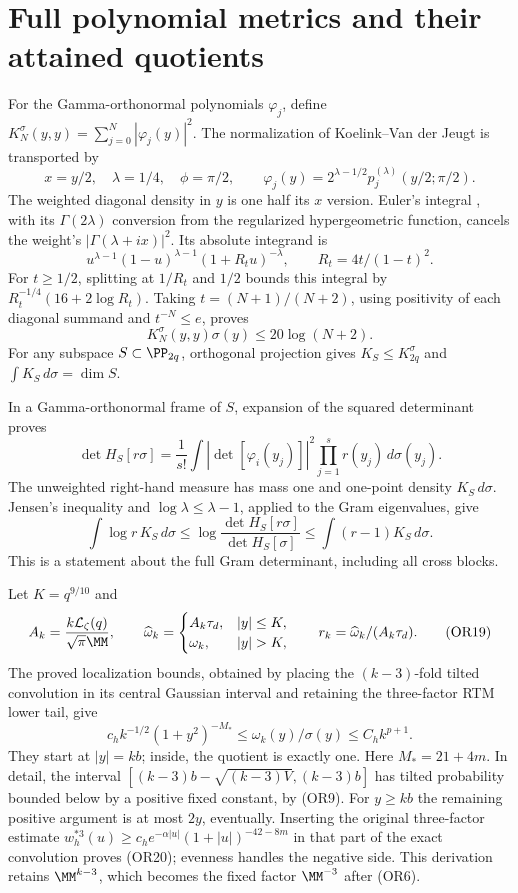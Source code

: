 \section{Full polynomial metrics and their attained quotients}
For the Gamma-orthonormal polynomials \(\varphi_j\), define
\(K_N^\sigma(y,y)=\sum_{j=0}^N|\varphi_j(y)|^2\).
The normalization of Koelink--Van der Jeugt
\cite[Proposition 2.1, (2.9)]{or:KVJ} is transported by
\[
 x=y/2,\quad\lambda=1/4,\quad\phi=\pi/2,\qquad
 \varphi_j(y)=2^{\lambda-1/2}p_j^{(\lambda)}(y/2;\pi/2).
\]
The weighted diagonal density in \(y\) is one half its \(x\) version.
Euler's integral \cite[(15.6.1)]{or:DLMFhyper}, with its
\(\Gamma(2\lambda)\) conversion from the regularized
hypergeometric function, cancels the weight's
\(|\Gamma(\lambda+ix)|^2\).  Its absolute integrand is
\[
 u^{\lambda-1}(1-u)^{\lambda-1}(1+R_tu)^{-\lambda},
 \qquad R_t=4t/(1-t)^2 .
 \]
For \(t\geq1/2\), splitting at \(1/R_t\) and \(1/2\) bounds this
integral by \(R_t^{-1/4}(16+2\log R_t)\).
Taking \(t=(N+1)/(N+2)\), using positivity of each diagonal
summand and \(t^{-N}\leq e\), proves
\[
 K_N^\sigma(y,y)\sigma(y)\leq20\log(N+2).              \tag{OR17}
\]
For any subspace \(S\subset\PP_{2q}\), orthogonal projection gives
\(K_S\leq K_{2q}^\sigma\) and \(\int K_S\,d\sigma=\dim S\).

In a Gamma-orthonormal frame of \(S\), expansion of the squared
determinant proves
\[
 \det H_S[r\sigma]
 =\frac1{s!}\int|\det[\varphi_i(y_j)]|^2
              \prod_{j=1}^s r(y_j)\,d\sigma(y_j).
 \]
The unweighted right-hand measure has mass one and one-point
density \(K_S\,d\sigma\).  Jensen's inequality and
\(\log\lambda\leq\lambda-1\), applied to the Gram eigenvalues, give
\[
 \int\log r\,K_S\,d\sigma
 \leq\log\frac{\det H_S[r\sigma]}{\det H_S[\sigma]}
 \leq\int(r-1)K_S\,d\sigma.                          \tag{OR18}
\]
This is a statement about the full Gram determinant, including all
cross blocks.

Let \(K=q^{9/10}\) and
\[
 A_k=\frac{k\mathcal L_\zeta(q)}{\sqrt\pi\MM},\qquad
 \widehat\omega_k=
 \begin{cases}A_k\tau_d,&|y|\leq K,\\
 \omega_k,&|y|>K,\end{cases}\qquad
 r_k=\widehat\omega_k/(A_k\tau_d).                    \tag{OR19}
\]
The proved localization bounds, obtained by placing the
\((k-3)\)-fold tilted convolution in its central Gaussian interval
and retaining the three-factor RTM lower tail, give
\[
 c_h k^{-1/2}(1+y^2)^{-M_*}
 \leq\omega_k(y)/\sigma(y)\leq C_hk^{p+1}.            \tag{OR20}
\]
They start at \(|y|=kb\); inside, the quotient is exactly one.
Here \(M_*=21+4m\).  In detail, the interval
\([(k-3)b-\sqrt{(k-3)V},(k-3)b]\) has tilted probability bounded
below by a positive fixed constant, by (OR9).  For \(y\geq kb\)
the remaining positive argument is at most \(2y\), eventually.
Inserting the original three-factor estimate
\(w_h^{*3}(u)\geq c_he^{-\alpha|u|}(1+|u|)^{-42-8m}\)
in that part of the exact convolution proves (OR20); evenness
handles the negative side.  This derivation retains \(\MM^{k-3}\),
which becomes the fixed factor \(\MM^{-3}\) after (OR6).

